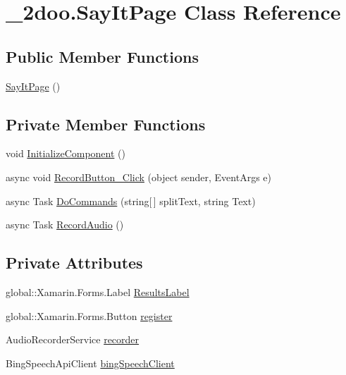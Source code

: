 \hypertarget{class__2doo_1_1_say_it_page}{
\section{\_\-2doo.SayItPage Class Reference}
\label{class__2doo_1_1_say_it_page}
}
\subsection*{Public Member Functions}
\begin{CompactItemize}
\item 
\hyperlink{class__2doo_1_1_say_it_page_7a5298e046d7b2c222f69373710f226c}{SayItPage} ()
\end{CompactItemize}
\subsection*{Private Member Functions}
\begin{CompactItemize}
\item 
void \hyperlink{class__2doo_1_1_say_it_page_c79aa5eec7664391a36b885ecb29ae45}{InitializeComponent} ()
\item 
async void \hyperlink{class__2doo_1_1_say_it_page_f20040dfacd2199bc111fbe551d8a16c}{RecordButton\_\-Click} (object sender, EventArgs e)
\item 
async Task \hyperlink{class__2doo_1_1_say_it_page_1986a9932d3da9e435354a38a72a8b17}{DoCommands} (string\mbox{[}$\,$\mbox{]} splitText, string Text)
\item 
async Task \hyperlink{class__2doo_1_1_say_it_page_42e69c719490a39d7472baa444a392c1}{RecordAudio} ()
\end{CompactItemize}
\subsection*{Private Attributes}
\begin{CompactItemize}
\item 
global::Xamarin.Forms.Label \hyperlink{class__2doo_1_1_say_it_page_a18bea9e3ec584d60e1b3f97542deb13}{ResultsLabel}
\item 
global::Xamarin.Forms.Button \hyperlink{class__2doo_1_1_say_it_page_4c3c18cdc322167802ac0336dafa158c}{register}
\item 
AudioRecorderService \hyperlink{class__2doo_1_1_say_it_page_9c5c1aef7e6e03f8a858ec7d8704b324}{recorder}
\item 
BingSpeechApiClient \hyperlink{class__2doo_1_1_say_it_page_d27794b09e8155ed858b66e65813cef6}{bingSpeechClient}
\end{CompactItemize}


